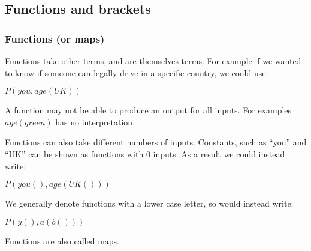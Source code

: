 
\subsection{Functions and brackets}

\subsubsection{Functions (or maps)}

Functions take other terms, and are themselves terms. For example if we wanted to know if someone can legally drive in a specific country, we could use:

$P(you,age(UK))$

A function may not be able to produce an output for all inputs. For examples \(age(green)\) has no interpretation.

Functions can also take different numbers of inputs. Constants, such as “you” and “UK” can be shown as functions with \(0\) inputs. As a result we could instead write:

$P(you(),age(UK()))$

We generally denote functions with a lower case letter, so would instead write:

$P(y(),a(b()))$

Functions are also called maps.

